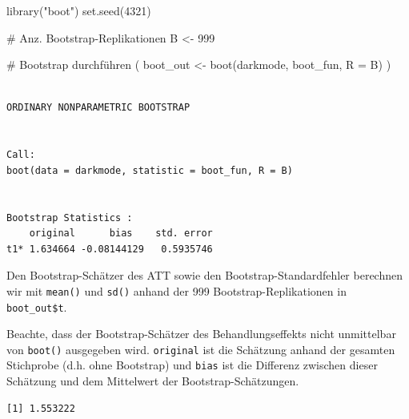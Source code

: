 \documentclass[
  a4paper,
  DIV=11,
  oneside]{scrreprt}
\newenvironment{Shaded}{\begin{snugshade}}{\end{snugshade}}
\newcommand{\AttributeTok}[1]{\textcolor[rgb]{0.40,0.45,0.13}{#1}}
\newcommand{\CommentTok}[1]{\textcolor[rgb]{0.37,0.37,0.37}{#1}}
\newcommand{\DecValTok}[1]{\textcolor[rgb]{0.68,0.00,0.00}{#1}}
\newcommand{\FunctionTok}[1]{\textcolor[rgb]{0.28,0.35,0.67}{#1}}
\newcommand{\NormalTok}[1]{\textcolor[rgb]{0.00,0.23,0.31}{#1}}
\newcommand{\OtherTok}[1]{\textcolor[rgb]{0.00,0.23,0.31}{#1}}
\newcommand{\SpecialCharTok}[1]{\textcolor[rgb]{0.37,0.37,0.37}{#1}}
\newcommand{\StringTok}[1]{\textcolor[rgb]{0.13,0.47,0.30}{#1}}
\begin{document}
\begin{Shaded}
\begin{Highlighting}[]
\FunctionTok{library}\NormalTok{(}\StringTok{"boot"}\NormalTok{)}
\FunctionTok{set.seed}\NormalTok{(}\DecValTok{4321}\NormalTok{)}

\CommentTok{\# Anz. Bootstrap{-}Replikationen}
\NormalTok{B }\OtherTok{\textless{}{-}} \DecValTok{999}

\CommentTok{\# Bootstrap durchführen}
\NormalTok{(}
\NormalTok{  boot\_out }\OtherTok{\textless{}{-}} \FunctionTok{boot}\NormalTok{(darkmode, boot\_fun, }\AttributeTok{R =}\NormalTok{ B)}
\NormalTok{)}
\end{Highlighting}
\end{Shaded}

\begin{verbatim}

ORDINARY NONPARAMETRIC BOOTSTRAP


Call:
boot(data = darkmode, statistic = boot_fun, R = B)


Bootstrap Statistics :
    original      bias    std. error
t1* 1.634664 -0.08144129   0.5935746
\end{verbatim}

Den Bootstrap-Schätzer des ATT sowie den Bootstrap-Standardfehler
berechnen wir mit \texttt{mean()} und \texttt{sd()} anhand der 999
Bootstrap-Replikationen in \texttt{boot\_out\$t}.

Beachte, dass der Bootstrap-Schätzer des Behandlungseffekts nicht
unmittelbar von \texttt{boot()} ausgegeben wird. \texttt{original} ist
die Schätzung anhand der gesamten Stichprobe (d.h. ohne Bootstrap) und
\texttt{bias} ist die Differenz zwischen dieser Schätzung und dem
Mittelwert der Bootstrap-Schätzungen.

\begin{Shaded}
\end{Shaded}

\begin{verbatim}
[1] 1.553222
\end{verbatim}

\begin{Shaded}
\end{Shaded}
\end{document}
